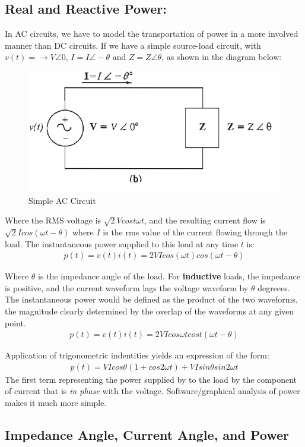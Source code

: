 \documentclass{book}
\begin{document}
\subsection{Real and Reactive Power:}

In AC circuits, we have to model the transportation of power in a more involved manner than DC circuits. If we have a simple source-load circuit, with $v(t)= \xrightarrow{} V \angle 0$, $I= I \angle -\theta$ and $Z=Z\angle \theta$, as shown in the diagram below:
\begin{figure}[h]
	\centering
	\includegraphics[width=0.3\linewidth]{Screenshots/v_load}
	\caption{Simple AC Circuit}
	\label{fig:vload}
\end{figure}

Where the RMS voltage is $\sqrt{2}V cost \omega t$, and the resulting current flow is $\sqrt{2}Icos(\omega t - \theta)$ where $I$ is the rms value of the current flowing through the load. The instantaneous power supplied to this load at any time $t$ is:
\begin{align*}
	p(t) = v(t)i(t) = 2VI cos(\omega t)cos(\omega t - \theta)
\end{align*}

Where $\theta$ is the impedance angle of the load. For \textbf{inductive} loads, the impedance is positive, and the current waveform lags the voltage waveform by $\theta$ degreees. The instantaneous power would be defined as the product of the two waveforms, the magnitude clearly determined by the overlap of the waveforms at any given point.
\begin{align*}
	p(t) = v(t)i(t) = 2VIcos \omega t cost(\omega t - \theta)
\end{align*}

Application of trigonometric indentities yields an expression of the form:
\begin{align*}
	p(t) = VI cos\theta(1+cos 2 \omega t) + VI sin\theta sin2\omega t
\end{align*}
The first term representing the power supplied by to the load by the component of current that is \textit{in phase} with the voltage. Software/graphical analysis of power makes it much more simple.

\subsection{Impedance Angle, Current Angle, and Power}
\end{document}
